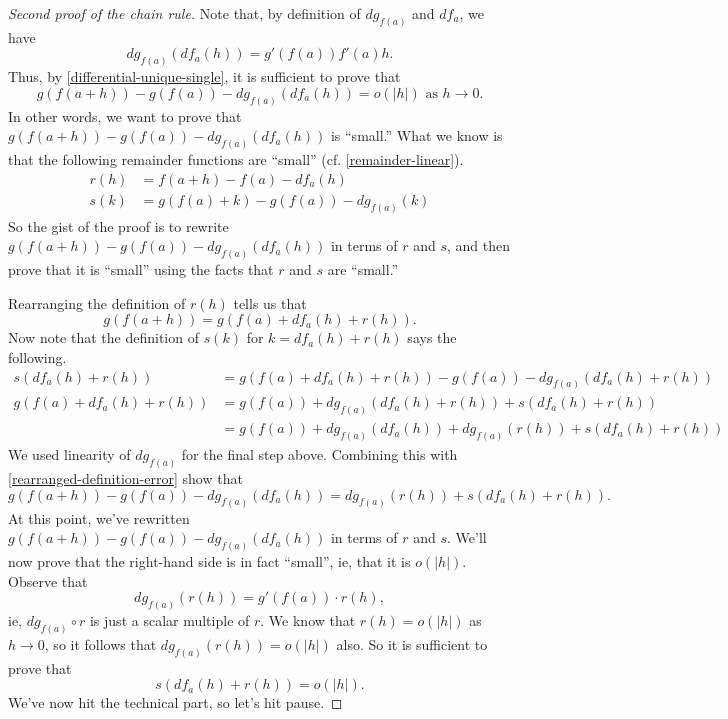 \begin{proof}[Second proof of the chain rule] \renewcommand{\qedsymbol}{}
	Note that, by definition of $dg_{f(a)}$ and $df_a$, we have 
	\[ dg_{f(a)}(df_a(h)) = g'(f(a))f'(a)h. \]
	Thus, by \cref{differential-unique-single}, it is sufficient to prove that
	\[ g(f(a+h))-g(f(a))-dg_{f(a)}(df_a(h)) = o(|h|) \text{ as } h \to 0. \]
	In other words, we want to prove that $g(f(a+h))-g(f(a))-dg_{f(a)}(df_a(h))$ is ``small.'' What we know is that the following remainder functions are ``small'' (cf. \cref{remainder-linear}).
	\[ \begin{aligned} 
	r(h) &= f(a+h)-f(a) - df_a(h) \\ 
	s(k) &= g(f(a)+k)-g(f(a))-dg_{f(a)}(k) \end{aligned} \]
	So the gist of the proof is to rewrite $g(f(a+h))-g(f(a))-dg_{f(a)}(df_a(h))$ in terms of $r$ and $s$, and then prove that it is ``small'' using the facts that $r$ and $s$ are ``small.''
	
	Rearranging the definition of $r(h)$ tells us that
	\begin{equation} \label{rearranged-definition-error} g(f(a+h)) = g(f(a) + df_a(h) + r(h)). \end{equation}
	Now note that the definition of $s(k)$ for $k = df_a(h) + r(h)$ says the following. 
	\[ \begin{aligned} s(df_a(h) + r(h)) &= g(f(a) + df_a(h) + r(h)) - g(f(a)) -dg_{f(a)}(df_a(h) + r(h)) \\
	g(f(a) + df_a(h) + r(h)) &= g(f(a)) + dg_{f(a)}(df_a(h) + r(h)) + s(df_a(h) + r(h)) \\
	&= g(f(a)) + dg_{f(a)}(df_a(h)) + dg_{f(a)}(r(h)) + s(df_a(h) + r(h))  \end{aligned} \]
	We used linearity of $dg_{f(a)}$ for the final step above. Combining this with \cref{rearranged-definition-error} show that
	\[ g(f(a+h)) - g(f(a)) - dg_{f(a)}(df_a(h)) = dg_{f(a)}(r(h)) + s(df_a(h)+r(h)). \]
	At this point, we've rewritten $g(f(a+h))-g(f(a))-dg_{f(a)}(df_a(h))$ in terms of $r$ and $s$. We'll now prove that the right-hand side is in fact ``small'', ie, that it is $o(|h|)$. Observe that \[ dg_{f(a)}(r(h)) = g'(f(a)) \cdot r(h), \] ie, $dg_{f(a)} \circ r$ is just a scalar multiple of $r$. We know that $r(h) = o(|h|)$ as $h \to 0$, so it follows that $dg_{f(a)}(r(h)) = o(|h|)$ also. So it is sufficient to prove that
	\[ s(df_a(h)+r(h)) = o(|h|). \]
	We've now hit the technical part, so let's hit pause. 
\end{proof}

